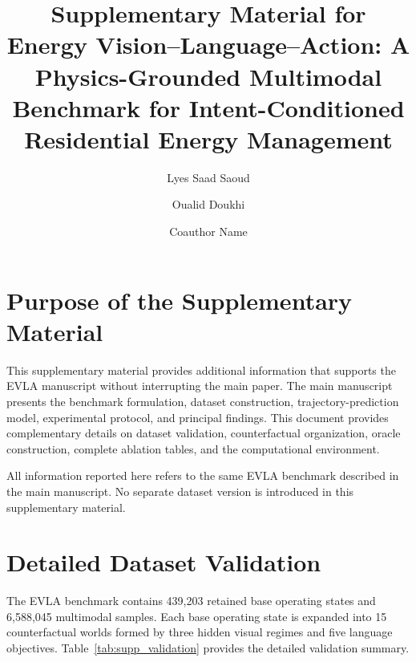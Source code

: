 \documentclass[preprint,12pt]{elsarticle}
\begin{document}
\begin{frontmatter}

\title{Supplementary Material for\\
Energy Vision--Language--Action: A Physics-Grounded Multimodal Benchmark for Intent-Conditioned Residential Energy Management}

\author[aff1]{Lyes Saad Saoud}
\author[aff1]{Oualid Doukhi}
\author[aff2]{Coauthor Name}



\end{frontmatter}

\section{Purpose of the Supplementary Material}
\label{supp:purpose}

This supplementary material provides additional information that supports the EVLA manuscript without interrupting the main paper. The main manuscript presents the benchmark formulation, dataset construction, trajectory-prediction model, experimental protocol, and principal findings. This document provides complementary details on dataset validation, counterfactual organization, oracle construction, complete ablation tables, and the computational environment.

All information reported here refers to the same EVLA benchmark described in the main manuscript. No separate dataset version is introduced in this supplementary material.

\section{Detailed Dataset Validation}
\label{supp:dataset_validation}

The EVLA benchmark contains 439,203 retained base operating states and 6,588,045 multimodal samples. Each base operating state is expanded into 15 counterfactual worlds formed by three hidden visual regimes and five language objectives. Table~\ref{tab:supp_validation} provides the detailed validation summary.
\end{document}
